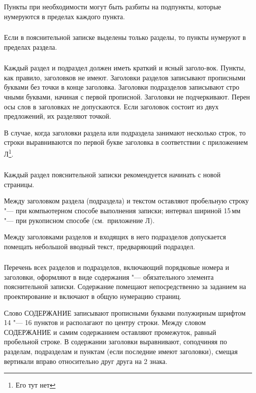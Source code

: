 Пункты при необходимости могут быть разбиты на подпункты, которые нумеруются в пределах каждого пункта. 

\subsubsection{}
Если в пояснительной записке выделены только разделы, то пункты нумеруют в пределах раздела.

\subsubsection{}
Каждый раздел и подраздел должен иметь краткий и ясный заголо-вок. Пункты, как правило, заголовков не имеют. Заголовки разделов записывают прописными буквами без точки в конце заголовка. Заголовки подразделов записывают стро чными буквами, начиная с первой прописной. Заголовки не подчеркивают. Перен осы слов в заголовках не допускаются. Если заголовок состоит из двух предложений, их разделяют точкой.

В случае, когда заголовки раздела или подраздела занимают несколько строк, то строки выравниваются  по первой букве  заголовка  в соответствии с приложением Л\footnote{Его тут нет}.

\subsubsection{}
Каждый раздел пояснительной записки рекомендуется начинать с новой страницы. 

Между заголовком раздела (подраздела) и текстом оставляют пробельную строку "--- при компьютерном способе выполнения  записки;  интервал  шириной 15\,мм "--- при рукописном способе (см.~приложение Л).

Между заголовками разделов и входящих в него подразделов допускается помещать небольшой вводный текст, предваряющий подраздел.

\subsubsection{}
Перечень всех разделов и подразделов, включающий порядковые номера и заголовки, оформляют в виде содержания "--- обязательного элемента пояснительной записки. Содержание помещают непосредственно за заданием на проектирование и включают в общую нумерацию страниц.

Слово \MakeUppercase{содержание} записывают прописными буквами полужирным шрифтом 14 "--- 16 пунктов и располагают по центру строки. Между словом \MakeUppercase{содержание} и самим содержанием оставляют промежуток, равный пробельной строке. В содержании заголовки выравнивают, соподчиняя по разделам, подразделам и пунктам (если последние имеют заголовки), смещая вертикали вправо относительно друг друга на 2 знака.

